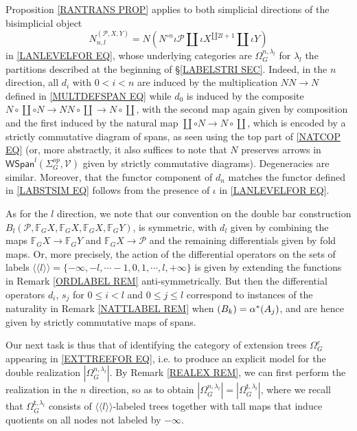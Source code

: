 \documentclass[a4paper,10pt
,draft
]{article}%
\numberwithin{equation}{section}
\numberwithin{figure}{section}
\theoremstyle{definition} %
\newcommand{\1}{\ensuremath{\mathbbm 1}}%
\begin{document}
Proposition \ref{RANTRANS PROP} applies to both simplicial directions of 
the bisimplicial object
\begin{equation}\label{BISIMP EQ}
	N^{(\mathcal P,X,Y)}_{n,l} =
	N ( N^{\circ n} \iota \mathcal{P} \amalg
	\iota X^{\amalg 2l+1} \amalg \iota Y)
\end{equation}
in \eqref{LANLEVELFOR EQ},
whose underlying categories are 
$\Omega_G^{n,\lambda_l}$
for $\lambda_l$ the partitions described at the beginning of
\S \ref{LABELSTRI SEC}.
Indeed, in the $n$ direction, all $d_i$ with $0 < i < n$
are induced by the multiplication $NN \to N$ defined in 
\eqref{MULTDEFSPAN EQ} while $d_0$
is induced by the composite
$N \circ \coprod \circ N \to N N \circ \coprod \to N \circ \coprod$, with the second map again given by composition
and the first induced
by the natural map 
$\coprod \circ N \to N \circ \coprod$, which is encoded by a strictly commutative diagram of spans,
as seen using the top part of \eqref{NATCOP EQ}
(or, more abstractly, 
it also suffices to note that 
$N$ preserves arrows in $\mathsf{WSpan}^l(\Sigma_G^{op},\mathcal{V})$ given by strictly commutative diagrams).
Degeneracies are similar.
Moreover, that the functor component of $d_n$
matches the functor defined in \eqref{LABSTSIM EQ}
follows from the presence of $\iota$ in \eqref{LANLEVELFOR EQ}.

As for the $l$ direction, we note that our convention on 
the double bar construction 
$B_l(\mathcal{P}, \mathbb{F}_G X, \mathbb{F}_G X, \mathbb{F}_G X, \mathbb{F}_G Y)$,
is symmetric, 
with $d_l$ given by combining the maps
$\mathbb{F}_G X \to \mathbb{F}_G Y$ 
and 
$\mathbb{F}_G X \to \mathcal{P}$
and the remaining differentials given by fold maps.
Or, more precisely, the action of the differential operators
on the sets of labels
$\langle \langle l \rangle \rangle = 
\{-\infty,-l, \cdots -1,0,1,\cdots,l,+\infty\}$
is given by extending the functions in 
Remark \ref{ORDLABEL REM} anti-symmetrically.
But then the differential operators 
$d_i$, $s_j$ for $0\leq i<l$ and $0\leq j \leq l$
correspond to instances of the naturality in 
Remark \ref{NATTLABEL REM}
when $(B_k) =\alpha^{\**}(A_j)$,
and are hence given by strictly commutative maps of spans.

Our next task is thus that of identifying the category of extension trees $\Omega_G^e$ appearing
in \eqref{EXTTREEFOR EQ},
i.e. to produce an explicit model for the double realization
$|\Omega_G^{n,\lambda_l}|$.
By Remark \ref{REALEX REM},
we can first perform the realization in the $n$ direction, so as to obtain
$|\Omega_G^{n,\lambda_l}|=|\Omega_G^{\mathsf{t},\lambda_l}|$,
where we recall that 
$\Omega_G^{\mathsf{t},\lambda_l}$
consists of $\langle \langle l \rangle \rangle$-labeled trees
together with tall maps that induce quotients on all nodes not labeled by $-\infty$.
\end{document}
